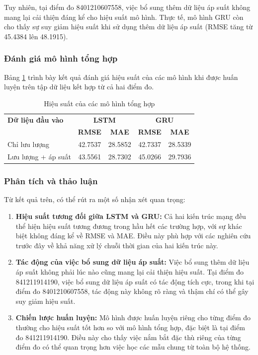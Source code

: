 Tuy nhiên, tại điểm đo 8401210607558, việc bổ sung thêm dữ liệu áp suất không mang lại cải thiện đáng kể cho hiệu suất mô hình. Thực tế, mô hình GRU còn cho thấy sự suy giảm hiệu suất khi sử dụng thêm dữ liệu áp suất (RMSE tăng từ 45.4384 lên 48.1915).

\subsubsection{Đánh giá mô hình tổng hợp}

Bảng \ref{tab:combined_model_performance} trình bày kết quả đánh giá hiệu suất của các mô hình khi được huấn luyện trên tập dữ liệu kết hợp từ cả hai điểm đo.

\begin{table}[htbp]
    \centering
    \caption{Hiệu suất của các mô hình tổng hợp}
    \label{tab:combined_model_performance}
    \begin{tabular}{|l|c|c|c|c|}
        \hline
        \textbf{Dữ liệu đầu vào} & \multicolumn{2}{c|}{\textbf{LSTM}} & \multicolumn{2}{c|}{\textbf{GRU}} \\
        \cline{2-5}
        & \textbf{RMSE} & \textbf{MAE} & \textbf{RMSE} & \textbf{MAE} \\
        \hline
        Chỉ lưu lượng & 42.7537 & 28.5852 & 42.7337 & 28.5339 \\
        \hline
        Lưu lượng + áp suất & 43.5561 & 28.7302 & 45.0266 & 29.7936 \\
        \hline
    \end{tabular}
\end{table}

\subsubsection{Phân tích và thảo luận}

Từ kết quả trên, có thể rút ra một số nhận xét quan trọng:

\begin{enumerate}
    \item \textbf{Hiệu suất tương đối giữa LSTM và GRU:} Cả hai kiến trúc mạng đều thể hiện hiệu suất tương đương trong hầu hết các trường hợp, với sự khác biệt không đáng kể về RMSE và MAE. Điều này phù hợp với các nghiên cứu trước đây về khả năng xử lý chuỗi thời gian của hai kiến trúc này.
    
    \item \textbf{Tác động của việc bổ sung dữ liệu áp suất:} Việc bổ sung thêm dữ liệu áp suất không phải lúc nào cũng mang lại cải thiện hiệu suất. Tại điểm đo 841211914190, việc bổ sung dữ liệu áp suất có tác động tích cực, trong khi tại điểm đo 8401210607558, tác động này không rõ ràng và thậm chí có thể gây suy giảm hiệu suất.
    
    \item \textbf{Chiến lược huấn luyện:} Mô hình được huấn luyện riêng cho từng điểm đo thường cho hiệu suất tốt hơn so với mô hình tổng hợp, đặc biệt là tại điểm đo 841211914190. Điều này cho thấy việc nắm bắt đặc thù riêng của từng điểm đo có thể quan trọng hơn việc học các mẫu chung từ toàn bộ hệ thống.
\end{enumerate}

